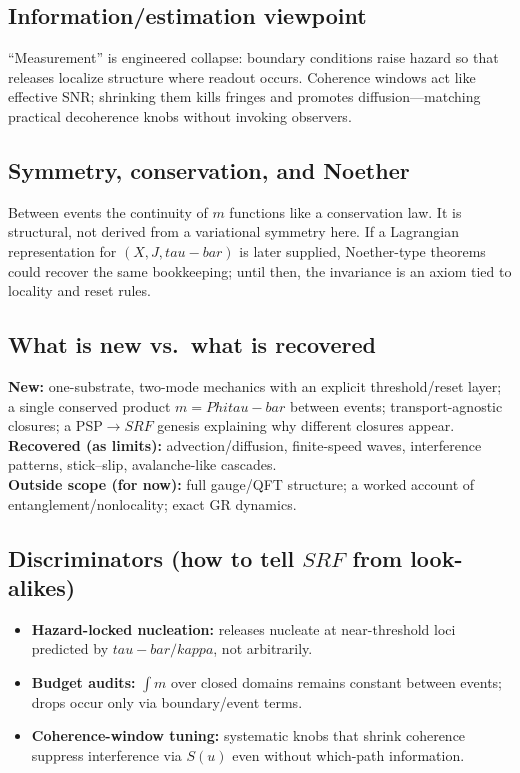 \documentclass[12pt]{article}
\newcommand{\FoldDensity}{\Phi}
\newcommand{\FoldTime}{\bar{\tau}}
\newcommand{\Threshold}{\kappa}
\newcommand{\Survival}{S}
\newcommand{\SRF}{\mathcal{F}_{\mathrm{SR}}}
\def\FoldDensity{Phi}%
\def\FoldTime{tau-bar}%
\def\Threshold{kappa}%
\def\SRF{SRF}%
\def\Survival{S}%
\def\bar#1{#1}%
\def\mathcal#1{#1}%
\def\mathrm#1{#1}%
\begin{document}
\subsection{Information/estimation viewpoint}
``Measurement'' is engineered collapse: boundary conditions raise hazard so that releases localize structure where readout occurs. Coherence windows act like effective SNR; shrinking them kills fringes and promotes diffusion---matching practical decoherence knobs without invoking observers.

\subsection{Symmetry, conservation, and Noether}
Between events the continuity of $m$ functions like a conservation law. It is structural, not derived from a variational symmetry here. If a Lagrangian representation for $(X,J,\FoldTime)$ is later supplied, Noether-type theorems could recover the same bookkeeping; until then, the invariance is an axiom tied to locality and reset rules.

\subsection{What is new vs.\ what is recovered}
\textbf{New:} one-substrate, two-mode mechanics with an explicit threshold/reset layer; a single conserved product $m=\FoldDensity\FoldTime$ between events; transport-agnostic closures; a PSP$\to\SRF$ genesis explaining why different closures appear.\\
\textbf{Recovered (as limits):} advection/diffusion, finite-speed waves, interference patterns, stick--slip, avalanche-like cascades.\\
\textbf{Outside scope (for now):} full gauge/QFT structure; a worked account of entanglement/nonlocality; exact GR dynamics.

\subsection{Discriminators (how to tell $\SRF$ from look-alikes)}
\begin{itemize}
  \item \textbf{Hazard-locked nucleation:} releases nucleate at near-threshold loci predicted by $\FoldTime/\Threshold$, not arbitrarily.
  \item \textbf{Budget audits:} $\int m$ over closed domains remains constant between events; drops occur only via boundary/event terms.
  \item \textbf{Coherence-window tuning:} systematic knobs that shrink coherence suppress interference via $\Survival(u)$ even without which-path information.
\end{itemize}
\end{document}
